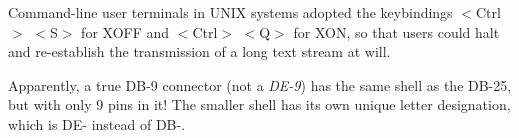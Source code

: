 Command-line user terminals in UNIX systems adopted the keybindings $<$Ctrl$>$ $<$S$>$ for XOFF and $<$Ctrl$>$ $<$Q$>$ for XON, so that users could halt and re-establish the transmission of a long text stream at will.

\vskip 10pt

Apparently, a true DB-9 connector (not a {\it DE-9}) has the same shell as the DB-25, but with only 9 pins in it!  The smaller shell has its own unique letter designation, which is DE- instead of DB-.











